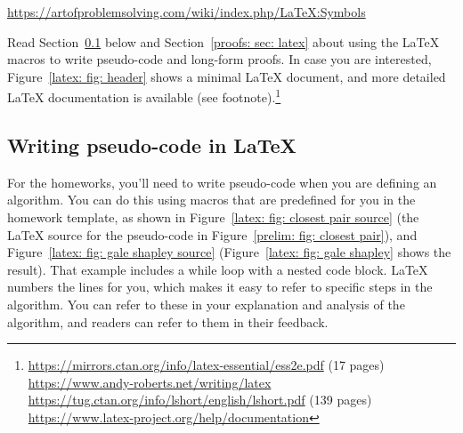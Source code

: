 \url{https://artofproblemsolving.com/wiki/index.php/LaTeX:Symbols}

\noindent  Read Section~\ref{latex: sec: latex pseudo-code} below and Section~\ref{proofs: sec: latex}
about using the LaTeX macros to write pseudo-code and long-form proofs.
In case you are interested, Figure~\ref{latex: fig: header} shows a minimal LaTeX document,
and more detailed LaTeX documentation is available (see footnote).\footnote
{\url{https://mirrors.ctan.org/info/latex-essential/ess2e.pdf}
  (17 pages)
  \\
  \url{https://www.andy-roberts.net/writing/latex}
  \\
 \url{https://tug.ctan.org/info/lshort/english/lshort.pdf}
 (139 pages)
 \\
 \url{https://www.latex-project.org/help/documentation}
}






\subsection{Writing pseudo-code in LaTeX}\label{latex: sec: latex pseudo-code}\hypertarget{latex.pseudocode}{}

For the homeworks, you'll need to write pseudo-code when you are defining an algorithm.
You can do this using macros that are predefined for you in the homework template,
as shown in Figure~\ref{latex: fig: closest pair source} (the LaTeX source for the pseudo-code in Figure~\ref{prelim: fig: closest pair}),
and Figure~\ref{latex: fig: gale shapley source} (Figure~\ref{latex: fig: gale shapley} shows the result).
That example includes a while loop with a nested code block.
LaTeX numbers the lines for you, which makes it easy to refer to specific steps in the algorithm.
You can refer to these in your explanation and analysis of the algorithm,
and readers can refer to them in their feedback.

